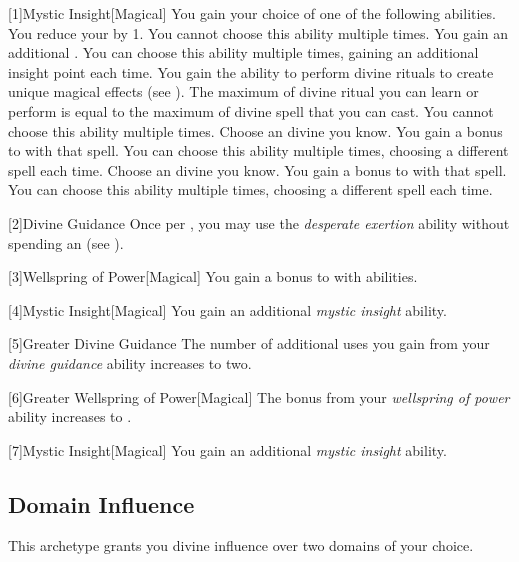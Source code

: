         [1]{Mystic Insight}[Magical]
        You gain your choice of one of the following abilities.
        {
             You reduce your  by 1.
                You cannot choose this ability multiple times.
             You gain an additional .
                You can choose this ability multiple times, gaining an additional insight point each time.
             You gain the ability to perform divine rituals to create unique magical effects (see ).
                The maximum  of divine ritual you can learn or perform is equal to the maximum  of divine spell that you can cast.
                You cannot choose this ability multiple times.
             Choose an divine  you know.
                You gain a  bonus to  with that spell.
                You can choose this ability multiple times, choosing a different spell each time.
             Choose an divine  you know.
                You gain a  bonus to  with that spell.
                You can choose this ability multiple times, choosing a different spell each time.
        }

        [2]{Divine Guidance} Once per , you may use the \textit{desperate exertion} ability without spending an  (see ).

        [3]{Wellspring of Power}[Magical]
        You gain a  bonus to  with  abilities.

        [4]{Mystic Insight}[Magical]
        You gain an additional \textit{mystic insight} ability.

        [5]{Greater Divine Guidance} The number of additional uses you gain from your \textit{divine guidance} ability increases to two.

        [6]{Greater Wellspring of Power}[Magical]
        The bonus from your \textit{wellspring of power} ability increases to .

        [7]{Mystic Insight}[Magical]
        You gain an additional \textit{mystic insight} ability.

    \subsection{Domain Influence}
        This archetype grants you divine influence over two domains of your choice.

